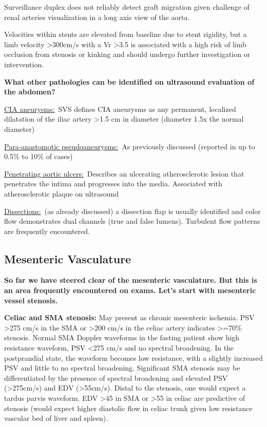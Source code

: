 \documentclass[
]{book}
\begin{document}
Surveillance duplex does not reliably detect graft migration given
challenge of renal arteries visualization in a long axis view of the
aorta.\citep{busch2009}

Velocities within stents are elevated from baseline due to stent
rigidity, but a limb velocity \textgreater300cm/s with a Vr \textgreater3.5 is associated
with a high risk of limb occlusion from stenosis or kinking and should
undergo further investigation or intervention.\citep{chaikof2018, blom2012}

\textbf{What other pathologies can be identified on ultrasound evaluation of
the abdomen?}

\uline{CIA aneurysms:}~SVS defines CIA aneurysms as any permanent,
localized dilatation of the iliac artery \textgreater1.5 cm in diameter (diameter
1.5x the normal diameter)

\uline{Para-anastomotic pseudoaneurysms:}~As previously discussed
(reported in up to 0.5\% to 10\% of cases)

\uline{Penetrating aortic ulcers:}~Describes an ulcerating
atherosclerotic lesion that penetrates the intima and progresses into
the media. Associated with atherosclerotic plaque on ultrasound

\uline{Dissections:}~(as already discussed) a dissection flap is
usually identified and color flow demonstrates dual channels (true and
false lumens). Turbulent flow patterns are frequently encountered.

\hypertarget{mesenteric-vasculature}{%
\subsection{Mesenteric Vasculature}\label{mesenteric-vasculature}}

\textbf{So far we have steered clear of the mesenteric vasculature. But this
is an area frequently encountered on exams. Let's start with mesenteric
vessel stenosis.}

\textbf{Celiac and SMA stenosis:} May present as chronic mesenteric ischemia.
PSV \textgreater275 cm/s in the SMA or \textgreater200 cm/s in the celiac artery indicates
\textgreater=70\% stenosis. Normal SMA Doppler waveforms in the fasting patient
show high resistance waveform, PSV \textless275 cm/s and no spectral
broadening. In the postprandial state, the waveform becomes low
resistance, with a slightly increased PSV and little to no spectral
broadening. Significant SMA stenosis may be differentiated by the
presence of spectral broadening and elevated PSV (\textgreater275cm/s) and EDV
(\textgreater55cm/s).\citep{aburahma2012, oderich2019} Distal to the stenosis, one
would expect a tardus parvis waveform. EDV \textgreater45 in SMA or \textgreater55 in celiac
are predictive of stenosis (would expect higher diastolic flow in celiac
trunk given low resistance vascular bed of liver and spleen).
\end{document}
